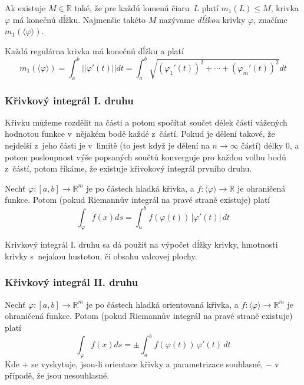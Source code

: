 \begin{definition}
	Ak existuje $M \in \mathbb{R}$ také, že pre každú lomenú čiaru~$L$
	platí $m_1(L) \leq M$, krivka $\varphi$ má konečnú dĺžku. Najmenšie 
	takéto $M$ nazývame {\em dĺžkou} krivky $\varphi$, značíme 
	$m_1(\langle \varphi \rangle)$.
\end{definition}

\begin{theorem}
	Každá regulárna krivka má konečnú dĺžku a platí
	\[
		m_1(\langle \varphi \rangle) = \int_a^b ||\varphi'(t)|| dt = \int_a^b \sqrt{(\varphi_1'(t))^2 + \cdots + (\varphi_m'(t))^2} dt
	\]
\end{theorem}

\subsubsection{Křivkový integrál I. druhu}


Křivku můžeme rozdělit na části a potom spočítat součet délek částí
vážených hodnotou funkce v~nějakém bodě každé z~částí. Pokud je
dělení takové, že nejdelší z~jeho části je v~limitě (to jest když je
dělení na $n\to \infty$ částí) délky 0, a potom posloupnost výše
popsaných součtů konverguje pro každou volbu bodů z~částí, potom říkáme,
že existuje křivokový integrál prvního druhu.


\begin{theorem}
Nechť $\varphi : [a,b] \to \mathbb{R}^m$ je po částech hladká křivka,
a $f : \langle \varphi \rangle \to \mathbb{R}$ je ohraničená funkce.
Potom (pokud Riemannův integrál na pravé straně existuje) platí
\[
 \int_\varphi f(x) ds = \int_a^b f(\varphi(t)) \, \lvert \varphi'(t) \rvert \, dt
\]
\end{theorem}

\begin{example}
\end{example}

Krivkový integrál I. druhu sa dá použiť na výpočet dĺžky krivky,
hmotnosti krivky s~nejakou hustotou, či obsahu valcovej plochy.

\subsubsection{Křivkový integrál II. druhu}

\begin{theorem}
Nechť $\varphi : [a,b] \to \mathbb{R}^m$ je po částech hladká
orientovaná křivka,
a $f : \langle \varphi \rangle \to \mathbb{R}^m$ je ohraničená funkce.
Potom (pokud Riemannův integrál na pravé straně existuje) platí
\[
 \int_\varphi f(x) ds = \pm \int_a^b f(\varphi(t)) \, \varphi'(t) \, dt
\]
Kde $+$ se vyskytuje, jsou-li orientace křivky a parametrizace souhlasné,
$-$ v případě, že jsou nesouhlasné.

\end{theorem}

